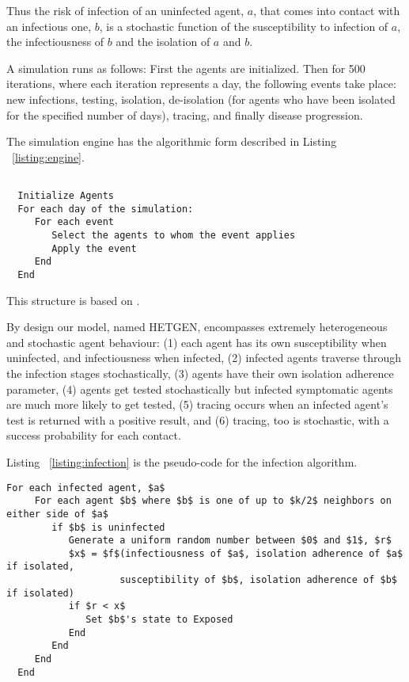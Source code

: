 \documentclass{article}
\begin{document}
Thus the risk of infection of an uninfected agent, $a$, that comes into contact
with an infectious one, $b$, is a stochastic function of the susceptibility to
infection of $a$, the infectiousness of $b$ and the isolation of $a$ and $b$.

A simulation runs as follows: First the agents are initialized. Then for 500
iterations, where each iteration represents a day, the following events take
place: new infections, testing, isolation, de-isolation (for agents who have
been isolated for the specified number of days), tracing, and finally disease
progression.

The simulation engine has the algorithmic form described in Listing
~\ref{listing:engine}.

\begin{minipage}{\linewidth}

\begin{lstlisting}[caption=Structure of the simulation engine, label=listing:engine]

  Initialize Agents
  For each day of the simulation:
     For each event
        Select the agents to whom the event applies
        Apply the event
     End
  End
\end{lstlisting}

\end{minipage}

This structure is based on \cite{Geffen2017}.

By design our model, named HETGEN, encompasses extremely heterogeneous and
stochastic agent behaviour: (1) each agent has its own susceptibility when
uninfected, and infectiousness when infected, (2) infected agents traverse
through the infection stages stochastically, (3) agents have their own isolation
adherence parameter, (4) agents get tested stochastically but infected
symptomatic agents are much more likely to get tested, (5) tracing occurs when
an infected agent's test is returned with a positive result, and (6) tracing,
too is stochastic, with a success probability for each contact.

Listing ~\ref{listing:infection} is the pseudo-code for the infection algorithm.

\begin{lstlisting}[mathescape=true, caption=Infection algorithm, label=listing:infection]
  For each infected agent, $a$
     For each agent $b$ where $b$ is one of up to $k/2$ neighbors on either side of $a$
        if $b$ is uninfected
           Generate a uniform random number between $0$ and $1$, $r$
           $x$ = $f$(infectiousness of $a$, isolation adherence of $a$ if isolated,
                    susceptibility of $b$, isolation adherence of $b$ if isolated)
           if $r < x$
              Set $b$'s state to Exposed
           End
        End
     End
  End
\end{lstlisting}
\end{document}
